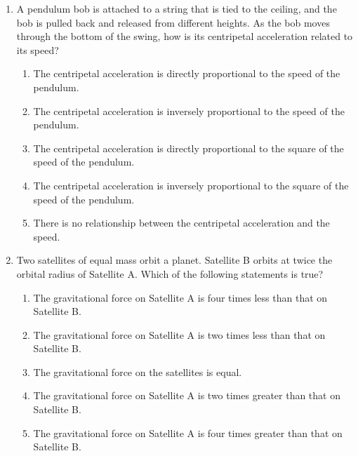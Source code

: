 \documentclass{../../../oss-classkick}
\begin{document}
\begin{multicols}{2}
\begin{enumerate}[leftmargin=18pt]
  \item A pendulum bob is attached to a string that is tied to the ceiling, and
    the bob is pulled back and released from different heights. As the bob moves
    through the bottom of the swing, how is its centripetal acceleration related
    to its speed?
    \begin{enumerate}[nosep,leftmargin=18pt,label=(\Alph*)]
    \item The centripetal acceleration is directly proportional to the speed
      of the pendulum.
    \item The centripetal acceleration is inversely proportional to the speed of
      the pendulum.
    \item  The centripetal acceleration is directly proportional to the square
      of the speed of the pendulum.
    \item The centripetal acceleration is inversely proportional to the square
      of the speed of the pendulum.
    \item There is no relationship between the centripetal acceleration and
      the speed.
    \end{enumerate}
    \vspace{.7in}
    
  \item Two satellites of equal mass orbit a planet. Satellite B orbits at twice
    the orbital radius of Satellite A. Which of the following statements is
    true?
    \begin{enumerate}[nosep,leftmargin=18pt,label=(\Alph*)]
    \item The gravitational force on Satellite A is four times less than that on
      Satellite B.
    \item The gravitational force on Satellite A is two times less than that on
      Satellite B.
    \item The gravitational force on the satellites is equal.
    \item The gravitational force on Satellite A is two times greater than that
      on Satellite B.
    \item The gravitational force on Satellite A is four times greater than that
      on Satellite B.
    \end{enumerate}
    \vspace{.7in}
    

\end{enumerate}
\end{multicols}
\end{document}
